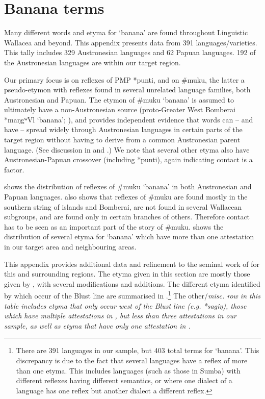 \chapter{Banana terms}\label{ch:BanTer}
Many different words
and etyma for ‘banana’ are found throughout
Linguistic Wallacea and beyond.
This appendix presents data from 391 languages/varieties.
This tally includes 329 Austronesian languages
and 62 Papuan languages.
192 of the Austronesian languages are within our target region.

Our primary focus is on reflexes of PMP *punti,
and on {\#}muku, the latter a pseudo-etymon with reflexes found
in several unrelated language families,
both Austronesian and Papuan.
The etymon of {\#}muku ‘banana’ is assumed to ultimately have
a non-Austronesian source (proto-Greater West Bomberai *maŋgʷVl
‘banana’; \citealp[478, 486]{UsherSchapper2022}),
and provides independent evidence that words can -- and have -- spread
widely through Austronesian languages in certain parts of the
target region without having to derive from a common Austronesian parent language.
(See discussion in 
and .) We note that several
other etyma also have Austronesian-Papuan crossover (including
*punti), again indicating contact is a factor.

 shows the distribution of reflexes of {\#}muku ‘banana’
in both Austronesian and Papuan languages.
 also shows that reflexes of {\#}muku are found mostly
in the southern string of islands
and Bomberai, are not found in several Wallacean subgroups,
and are found only in certain branches of others.
Therefore contact has to be seen as an important part of the story of {\#}muku.
 shows the distribution of several etyma for ‘banana’
which have more than one attestation in our target area and neighbouring areas.

This appendix provides additional data
and refinement to the seminal work of \citet{DonohueDenham2009}
for this and surrounding regions.
The etyma given in this section are mostly those given by \citet{DonohueDenham2009},
with several modifications and additions.
The different etyma identified by \citeauthor{DonohueDenham2009}
which occur  of the Blust line are summarised
in .\footnote{
		There are 391 languages in our sample,
		but 403 total terms for ‘banana’.
		This discrepancy is due to the fact that several languages
		have a reflex of more than one etyma.
		This includes languages (such as those in Sumba)
		with different reflexes having different semantics,
		or where one dialect of a language has one reflex
		but another dialect a different reflex.}
The other/\it{misc.} row in this table includes
etyma that only occur west of the Blust line (e.g. *sagiŋ),
those which have multiple attestations in \citet{DonohueDenham2009},
but less than three attestations in our sample,
as well as etyma that have only one attestation in \citeauthor{DonohueDenham2009}.

